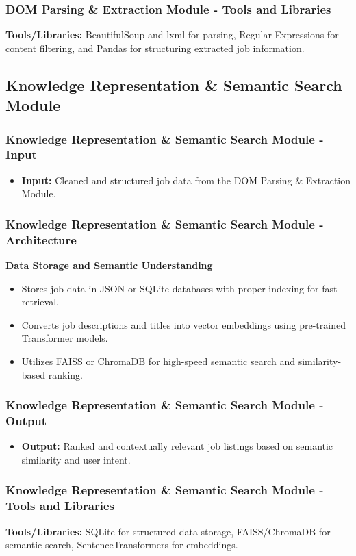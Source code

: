 \documentclass{beamer}
\begin{document}
\begin{frame}
\frametitle{DOM Parsing \& Extraction Module - Tools and Libraries}
\textbf{Tools/Libraries:} BeautifulSoup and lxml for parsing, Regular Expressions for content filtering, and Pandas for structuring extracted job information.
\end{frame}

\subsection{Knowledge Representation \& Semantic Search Module}

\begin{frame}
\frametitle{Knowledge Representation \& Semantic Search Module - Input}
\begin{itemize}
    \item \textbf{Input:} Cleaned and structured job data from the DOM Parsing \& Extraction Module.
\end{itemize}
\end{frame}

\begin{frame}
\frametitle{Knowledge Representation \& Semantic Search Module - Architecture}
\textbf{Data Storage and Semantic Understanding}
\begin{itemize}
    \item Stores job data in JSON or SQLite databases with proper indexing for fast retrieval.
    \item Converts job descriptions and titles into vector embeddings using pre-trained Transformer models.
    \item Utilizes FAISS or ChromaDB for high-speed semantic search and similarity-based ranking.
\end{itemize}
\end{frame}

\begin{frame}
\frametitle{Knowledge Representation \& Semantic Search Module - Output}
\begin{itemize}
    \item \textbf{Output:} Ranked and contextually relevant job listings based on semantic similarity and user intent.
\end{itemize}
\end{frame}

\begin{frame}
\frametitle{Knowledge Representation \& Semantic Search Module - Tools and Libraries}
\textbf{Tools/Libraries:} SQLite for structured data storage, FAISS/ChromaDB for semantic search, SentenceTransformers for embeddings. 
\end{frame}
\end{document}

